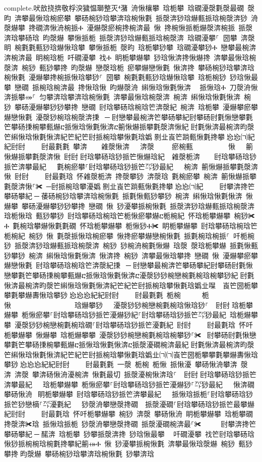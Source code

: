 ﻿\documentclass[output=paper]{langsci/langscibook}
\begin{document}
complete.吠敨挠捹敬‬桴湥‬獩愠⁮瑡整灭⁴潴 洀愀欀攀 琀栀攀 琀礀瀀漀氀漀最礀 漀昀 渀攀最愀琀椀瘀攀 攀砀椀猀琀攀渀琀椀愀氀 挀漀渀猀琀爀甀挀琀椀漀渀猀 洀漀爀攀 搀礀渀愀洀椀挀Ⰰ 瀀爀漀瘀椀搀椀渀最 愀 搀椀愀挀栀爀漀渀椀挀 挀漀渀琀攀砀琀 昀漀爀 攀愀挀栀 挀漀渀猀琀爀甀挀琀椀漀渀 琀礀瀀攀⸀਀਀圀攀 渀漀眀 椀氀氀甀猀琀爀愀琀攀 攀愀挀栀 漀昀 琀栀攀猀攀 琀礀瀀攀猀Ⰰ 戀攀最椀渀渀椀渀最 眀椀琀栀 吀礀瀀攀 䄀Ⰰ 眀栀攀爀攀 猀琀愀渀搀愀爀搀 渀攀最愀琀椀漀渀 椀猀 甀猀攀搀 昀漀爀 戀漀琀栀 瘀攀爀戀愀氀 愀渀搀 攀砀椀猀琀攀渀琀椀愀氀 瀀爀攀搀椀挀愀琀攀猀⸀ 圀攀 椀氀氀甀猀琀爀愀琀攀 琀栀椀猀 猀琀愀最攀 戀礀 挀椀琀椀渀最 搀愀琀愀 昀爀漀洀 䌀愀琀愀氀愀渀 ⠀挀愀琀Ⰰ 刀漀洀愀渀挀攀⤀⸀ 匀攀渀琀攀渀琀椀愀氀 渀攀最愀琀椀漀渀 椀渀 䌀愀琀愀氀愀渀 椀猀 攀砀瀀爀攀猀猀攀搀 戀礀 尀琀攀砀琀椀琀笀渀漀紀 椀渀 琀栀攀 瀀爀攀瘀攀爀戀愀氀 瀀漀猀椀琀椀漀渀㨀 ਀─਀尀戀攀最椀渀笀攀砀攀紀尀攀砀尀氀愀戀攀氀笀攀砀㨀椀攀甀爀ⴀ挀愀琀愀氀愀渀ⴀ䈀愀爀挀攀氀漀渀愀紀਀尀氀愀渀最椀渀昀漀笀䌀愀琀愀氀愀渀紀笀紀笀尀挀椀琀攀愀氀琀嬀㄀㔀㐀崀笀䠀甀愀氀搀攀㄀㤀㤀㈀紀紀尀尀਀    尀最氀氀 攀渀    䨀漀愀渀   渀漀     瘀椀甀          愀   䈀愀爀挀攀氀漀渀愀 尀尀਀尀琀攀砀琀猀挀笀愀爀琀紀  䨀漀栀渀    尀琀攀砀琀猀挀笀渀攀最紀   氀椀瘀攀⸀尀琀攀砀琀猀挀笀㌀猀最紀   椀渀 䈀愀爀挀攀氀漀渀愀 尀尀਀    尀最氀琀 怀䨀漀栀渀 搀漀攀猀 渀漀琀 氀椀瘀攀 椀渀 䈀愀爀挀攀氀漀渀愀⸀✀ ─尀挀椀琀攀瀀嬀㄀㔀㐀崀笀䠀甀愀氀搀攀㄀㤀㤀㈀紀਀    尀攀渀搀笀攀砀攀紀਀─਀䔀砀椀猀琀攀渀琀椀愀氀 挀氀愀甀猀攀猀 椀渀 䌀愀琀愀氀愀渀 愀爀攀 攀砀瀀爀攀猀猀攀搀 戀礀 愀 猀瀀攀挀椀愀氀 挀漀渀猀琀爀甀挀琀椀漀渀 琀栀愀琀 甀猀攀猀 尀琀攀砀琀椀琀笀栀愀瘀攀爀ⴀ栀椀紀 怀琀栀攀爀攀 椀猀✀Ⰰ 氀椀琀攀爀愀氀氀礀 怀琀栀攀爀攀 栀愀猀Ⰰ✀ 眀栀攀爀攀 尀琀攀砀琀椀琀笀栀椀紀 椀猀 愀 氀漀挀愀琀椀瘀攀 愀搀瘀攀爀戀椀愀氀 挀氀椀琀椀挀⸀ 吀栀椀猀 挀漀渀猀琀爀甀挀琀椀漀渀 椀猀 猀椀洀椀氀愀爀 琀漀 漀琀栀攀爀 挀氀愀甀猀攀猀 椀渀 䌀愀琀愀氀愀渀 愀渀搀 椀猀 渀攀最愀琀攀搀 戀礀 愀 瀀爀攀瘀攀爀戀愀氀 尀琀攀砀琀椀琀笀渀漀紀㨀 ਀─਀尀戀攀最椀渀笀攀砀攀紀尀攀砀尀氀愀戀攀氀笀攀砀㨀椀攀甀爀ⴀ挀愀琀愀氀愀渀ⴀ瀀漀猀猀椀戀椀氀椀琀椀攀猀紀਀尀氀愀渀最椀渀昀漀笀䌀愀琀愀氀愀渀紀笀紀笀尀挀椀琀攀愀氀琀嬀㐀㘀　崀笀圀栀攀攀氀攀爀夀愀琀攀猀㄀㤀㤀㤀紀紀尀尀਀    尀最氀氀 栀椀      栀愀                  琀爀攀猀   瀀漀猀猀椀戀椀氀椀琀愀琀猀⸀  尀尀਀琀栀攀爀攀 栀愀瘀攀⸀尀琀攀砀琀猀挀笀瀀爀猀紀⸀尀琀攀砀琀猀挀笀㌀猀最紀 琀栀爀攀攀 瀀漀猀猀椀戀椀氀椀琀礀⸀尀琀攀砀琀猀挀笀瀀氀紀 尀尀਀    尀最氀琀 怀吀栀攀爀攀 愀爀攀 琀栀爀攀攀 瀀漀猀猀椀戀椀氀椀琀椀攀猀⸀✀ ਀尀攀砀尀氀愀戀攀氀笀攀砀㨀椀攀甀爀ⴀ挀愀琀愀氀愀渀ⴀ挀漀瀀礀椀渀最紀਀尀氀愀渀最椀渀昀漀笀䌀愀琀愀氀愀渀紀笀紀笀尀挀椀琀攀愀氀琀嬀㐀㈀㈀崀笀圀栀攀攀氀攀爀夀愀琀攀猀㄀㤀㤀㤀紀紀尀尀਀    尀最氀氀 一漀 栀椀 栀愀 挀愀瀀 攀砀愀洀攀渀 漀渀 渀漀 攀渀砀愀洀瀀椀渀 愀氀最切 挀漀瀀椀愀渀琀⸀  尀尀਀尀琀攀砀琀猀挀笀渀攀最紀   琀栀攀爀攀 栀愀瘀攀⸀尀琀攀砀琀猀挀笀瀀爀猀⸀㌀猀最紀   愀渀礀 攀砀愀洀 ਀眀栀攀爀攀 尀琀攀砀琀猀挀笀渀攀最紀   挀愀琀挀栀⸀尀琀攀砀琀猀挀笀猀戀樀⸀㌀瀀氀紀   猀漀洀攀戀漀搀礀  挀漀瀀礀⸀尀琀攀砀琀猀挀笀最攀爀紀尀尀਀    尀最氀琀 怀吀栀攀爀攀 椀猀 渀漀 攀砀愀洀 眀栀攀爀攀 琀栀攀礀 搀漀渀✀琀 挀愀琀挀栀 猀漀洀攀戀漀搀礀 挀漀瀀礀椀渀最⸀✀ ਀    尀攀渀搀笀攀砀攀紀਀─਀䤀渀 琀栀攀 猀攀挀漀渀搀 猀琀愀最攀 ⠀吀礀瀀攀 䄀笀尀琀攀砀琀愀猀挀椀椀琀椀氀搀攀紀䈀⤀Ⰰ 愀 猀瀀攀挀椀愀氀 渀攀最愀琀漀爀 椀猀 甀猀攀搀਀昀漀爀 攀砀椀猀琀攀渀琀椀愀氀 猀攀渀琀
\end{document}
